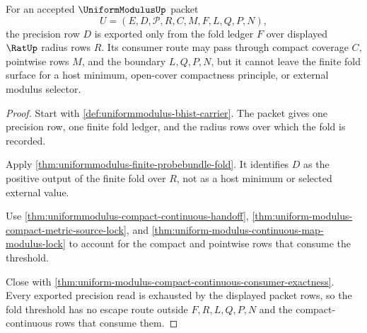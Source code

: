 \begin{theorem}
\label{thm:uniformmodulus-fold-threshold-nonescape}
For an accepted $\UniformModulusUp$ packet
$$
U=(E,D,\mathcal{P},R,C,M,F,L,Q,P,N),
$$
the precision row $D$ is exported only from the fold ledger $F$ over displayed $\RatUp$ radius rows $R$. Its consumer route may pass through compact coverage $C$, pointwise rows $M$, and the boundary $L,Q,P,N$, but it cannot leave the finite fold surface for a host minimum, open-cover compactness principle, or external modulus selector.
\end{theorem}
\begin{proof}
Start with \autoref{def:uniformmodulus-bhist-carrier}. The packet gives one precision row, one finite fold ledger, and the radius rows over which the fold is recorded.

Apply \autoref{thm:uniformmodulus-finite-probebundle-fold}. It identifies $D$ as the positive output of the finite fold over $R$, not as a host minimum or selected external value.

Use \autoref{thm:uniformmodulus-compact-continuous-handoff}, \autoref{thm:uniform-modulus-compact-metric-source-lock}, and \autoref{thm:uniform-modulus-continuous-map-modulus-lock} to account for the compact and pointwise rows that consume the threshold.

Close with \autoref{thm:uniform-modulus-compact-continuous-consumer-exactness}. Every exported precision read is exhausted by the displayed packet rows, so the fold threshold has no escape route outside $F,R,L,Q,P,N$ and the compact-continuous rows that consume them.
\end{proof}

